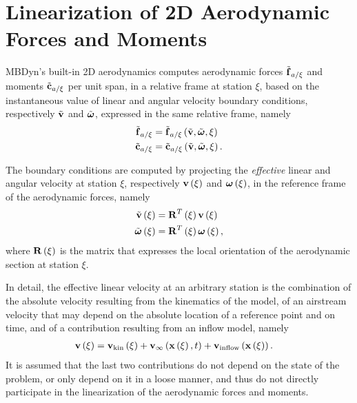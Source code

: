 \section{Linearization of 2D Aerodynamic Forces and Moments}
MBDyn's built-in 2D aerodynamics computes
aerodynamic forces $\tilde{\bm{\mathbf{f}}}_{a/\xi}$
and moments $\tilde{\bm{\mathbf{c}}}_{a/\xi}$ per unit span,
in a relative frame at station $\xi$,
based on the instantaneous value of linear and angular velocity
boundary conditions, respectively $\tilde{\bm{\mathbf{v}}}$ and $\tilde{\bm{\mathbf{\omega}}}$,
expressed in the same relative frame, namely
\begin{subequations}
\begin{align}
	\tilde{\bm{\mathbf{f}}}_{a/\xi}
	&=
	\tilde{\bm{\mathbf{f}}}_{a/\xi}\left( \tilde{\bm{\mathbf{v}}}, \tilde{\bm{\mathbf{\omega}}}, \xi \right)
	\\
	\tilde{\bm{\mathbf{c}}}_{a/\xi}
	&=
	\tilde{\bm{\mathbf{c}}}_{a/\xi}\left( \tilde{\bm{\mathbf{v}}}, \tilde{\bm{\mathbf{\omega}}}, \xi \right)
	.
\end{align}
\end{subequations}

The boundary conditions are computed by projecting the \emph{effective}
linear and angular velocity at station $\xi$,
respectively $\bm{\mathbf{v}}\left( \xi \right)$ and $\bm{\mathbf{\omega}}\left( \xi \right)$,
in the reference frame of the aerodynamic forces,
namely
\begin{subequations}
\begin{align}
	\tilde{\bm{\mathbf{v}}}\left( \xi \right)
	&=
	\bm{\mathbf{R}}^T\left( \xi \right) \bm{\mathbf{v}}\left( \xi \right)
	\\
	\tilde{\bm{\mathbf{\omega}}}\left( \xi \right)
	&=
	\bm{\mathbf{R}}^T\left( \xi \right) \bm{\mathbf{\omega}}\left( \xi \right)
	,
\end{align}
\end{subequations}
where $\bm{\mathbf{R}}\left( \xi \right)$ is the matrix that expresses
the local orientation of the aerodynamic section at station $\xi$.

In detail, the effective linear velocity at an arbitrary station
is the combination of the absolute velocity resulting from the kinematics
of the model, of an airstream velocity that may depend
on the absolute location of a reference point and on time,
and of a contribution resulting from an inflow model, namely
\begin{align}
	\bm{\mathbf{v}}\left( \xi \right)
	&=
	\bm{\mathbf{v}}_{\text{kin}}\left( \xi \right)
	+ \bm{\mathbf{v}}_{\infty}\left( \bm{\mathbf{x}}\left( \xi \right), t \right)
	+ \bm{\mathbf{v}}_{\text{inflow}}\left( \bm{\mathbf{x}}\left( \xi \right) \right)
	.
\end{align}
It is assumed that the last two contributions do not depend
on the state of the problem, or only depend on it in a loose manner,
and thus do not directly participate in the linearization
of the aerodynamic forces and moments.

